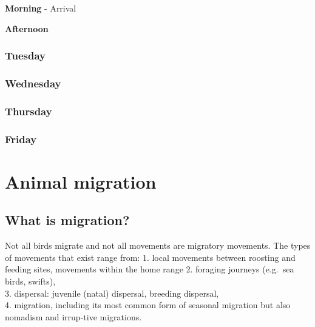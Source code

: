 \documentclass[
]{book}
\begin{document}
\textbf{Morning} - Arrival

\textbf{Afternoon}

\hypertarget{tuesday}{%
\subsection{Tuesday}\label{tuesday}}

\hypertarget{wednesday}{%
\subsection{Wednesday}\label{wednesday}}

\hypertarget{thursday}{%
\subsection{Thursday}\label{thursday}}

\hypertarget{friday}{%
\subsection{Friday}\label{friday}}

\hypertarget{animal-migration}{%
\chapter{Animal migration}\label{animal-migration}}

\hypertarget{what-is-migration}{%
\section{What is migration?}\label{what-is-migration}}

Not all birds migrate and not all movements are migratory movements. The types of movements that exist range from:
1. local movements between roosting and feeding sites, movements within the home range
2. foraging journeys (e.g.~sea birds, swifts),\\
3. dispersal: juvenile (natal) dispersal, breeding dispersal,\\
4. migration, including its most common form of seasonal migration but also nomadism and irrup-tive migrations.
\end{document}
